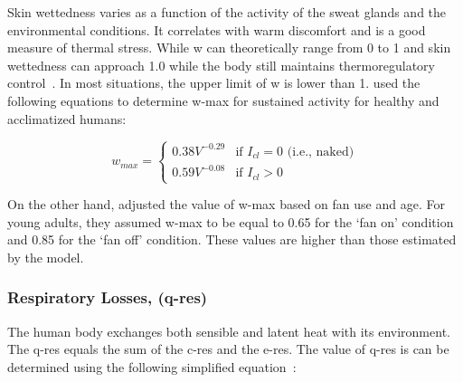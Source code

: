 Skin wettedness varies as a function of the activity of the sweat glands and the environmental conditions.
It correlates with warm discomfort and is a good measure of thermal stress.
While \ac{w} can theoretically range from 0 to 1 and skin wettedness can approach 1.0 while the body still maintains thermoregulatory control~\cite{ASHRA2017}.
In most situations, the upper limit of \ac{w} is lower than 1.
 used the following equations to determine \ac{w-max} for sustained activity for healthy and acclimatized humans:

\begin{equation}
    w_{max}=
\begin{cases}
    0.38 V^{-0.29} & \text{if } I_{cl} = 0 \text{ (i.e., naked)} \\
    0.59 V^{-0.08} & \text{if } I_{cl} > 0
\end{cases}
\end{equation}

On the other hand,  adjusted the value of \ac{w-max} based on fan use and age.
For young adults, they assumed \ac{w-max} to be equal to 0.65 for the `fan on' condition and 0.85 for the `fan off' condition.
These values are higher than those estimated by the  model.

\subsubsection{Respiratory Losses, (\acs{q-res})}
The human body exchanges both sensible and latent heat with its environment.
The \acf{q-res} equals the sum of the \ac{c-res} and the \ac{e-res}.
The value of \ac{q-res} is can be determined using the following simplified equation~\cite{ASHRA2017}:

